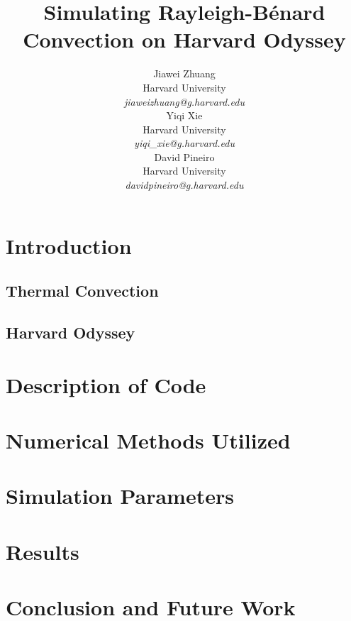 \documentclass{article}
\title{Simulating Rayleigh-Bénard Convection on Harvard Odyssey}
\author{
   Jiawei Zhuang \\
   Harvard University\\
   \textit{jiaweizhuang@g.harvard.edu}\\
   \And
   Yiqi Xie \\
   Harvard University \\
   \textit{yiqi\_xie@g.harvard.edu}\\
   \And
   David Pineiro \\
   Harvard University \\
   \textit{davidpineiro@g.harvard.edu}\\
}
\begin{document}
\maketitle


\section{Introduction}



\subsection{Thermal Convection}

\subsection{Harvard Odyssey}


\section{Description of Code}





\section{Numerical Methods Utilized}


\section{Simulation Parameters}


\section{Results}



\section{Conclusion and Future Work}

\end{document}
